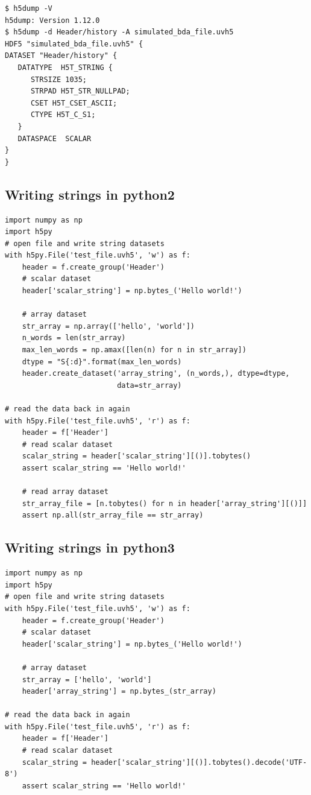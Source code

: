\documentclass[11pt, oneside]{article}
\begin{document}
\begin{appendices}
\begin{verbatim}
$ h5dump -V
h5dump: Version 1.12.0
$ h5dump -d Header/history -A simulated_bda_file.uvh5
HDF5 "simulated_bda_file.uvh5" {
DATASET "Header/history" {
   DATATYPE  H5T_STRING {
      STRSIZE 1035;
      STRPAD H5T_STR_NULLPAD;
      CSET H5T_CSET_ASCII;
      CTYPE H5T_C_S1;
   }
   DATASPACE  SCALAR
}
}
\end{verbatim}

\subsection{Writing strings in python2}
\begin{verbatim}
import numpy as np
import h5py
# open file and write string datasets
with h5py.File('test_file.uvh5', 'w') as f:
    header = f.create_group('Header')
    # scalar dataset
    header['scalar_string'] = np.bytes_('Hello world!')

    # array dataset
    str_array = np.array(['hello', 'world'])
    n_words = len(str_array)
    max_len_words = np.amax([len(n) for n in str_array])
    dtype = "S{:d}".format(max_len_words)
    header.create_dataset('array_string', (n_words,), dtype=dtype,
                          data=str_array)

# read the data back in again
with h5py.File('test_file.uvh5', 'r') as f:
    header = f['Header']
    # read scalar dataset
    scalar_string = header['scalar_string'][()].tobytes()
    assert scalar_string == 'Hello world!'

    # read array dataset
    str_array_file = [n.tobytes() for n in header['array_string'][()]]
    assert np.all(str_array_file == str_array)
\end{verbatim}

\subsection{Writing strings in python3}
\begin{verbatim}
import numpy as np
import h5py
# open file and write string datasets
with h5py.File('test_file.uvh5', 'w') as f:
    header = f.create_group('Header')
    # scalar dataset
    header['scalar_string'] = np.bytes_('Hello world!')

    # array dataset
    str_array = ['hello', 'world']
    header['array_string'] = np.bytes_(str_array)

# read the data back in again
with h5py.File('test_file.uvh5', 'r') as f:
    header = f['Header']
    # read scalar dataset
    scalar_string = header['scalar_string'][()].tobytes().decode('UTF-8')
    assert scalar_string == 'Hello world!'


\end{verbatim}
\end{appendices}
\end{document}
